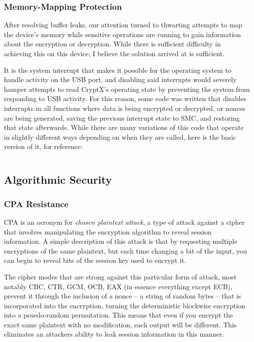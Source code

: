 \documentclass[titlepage]{report}
\begin{document}
	\subsubsection{Memory-Mapping Protection}
	After resolving buffer leaks, our attention turned to thwarting attempts to map the device's memory while sensitive operations are running to gain information about the encryption or decryption. While there is sufficient difficulty in achieving this on this device, I believe the solution arrived at is sufficient.
	
	It is the system interrupt that makes it possible for the operating system to handle activity on the USB port, and disabling said interrupts would severely hamper attempts to read CryptX's operating state by preventing the system from responding to USB activity. For this reason, some code was written that disables interrupts in all functions where data is being encrypted or decrypted, or nonces are being generated, saving the previous interrupt state to SMC, and restoring that state afterwards. While there are many variations of this code that operate in slightly different ways depending on when they are called, here is the basic version of it, for reference:
	\inputminted{tasm}{code/disable_interrupts.asm}
	
	\subsection{Algorithmic Security}
	\subsubsection{CPA Resistance}
	CPA is an acronym for \textit{chosen plaintext attack}, a type of attack against a cipher that involves manipulating the encryption algorithm to reveal session information. A simple description of this attack is that by requesting multiple encryptions of the same plaintext, but each time changing a bit of the input, you can begin to reveal bits of the session key used to encrypt it.
	
	The cipher modes that are strong against this particular form of attack, most notably CBC, CTR, GCM, OCB, EAX (in essence everything except ECB), prevent it through the inclusion of a nonce -- a string of random bytes -- that is incorporated into the encryption, turning the deterministic blockwise encryption into a psuedo-random permutation. This means that even if you encrypt the exact same plaintext with no modification, each output will be different. This eliminates an attackers ability to leak session information in this manner.
	
\end{document}

